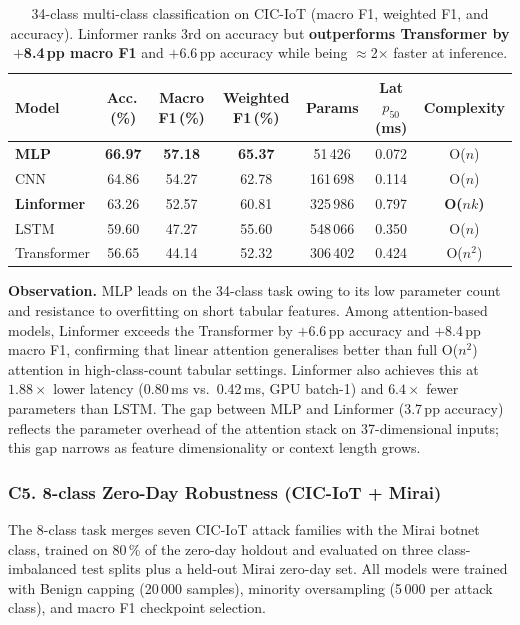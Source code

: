 \begin{table}[h]
\centering
\caption{34-class multi-class classification on CIC-IoT (macro F1, weighted F1,
and accuracy). Linformer ranks 3rd on accuracy but \textbf{outperforms
Transformer by $+$8.4\,pp macro F1} and $+$6.6\,pp accuracy while being
$\approx$2$\times$ faster at inference.}
\label{tab:multiclass}
\begin{tabular}{lcccccc}
\toprule
\textbf{Model} & \textbf{Acc.\,(\%)} & \textbf{Macro F1\,(\%)} &
\textbf{Weighted F1\,(\%)} & \textbf{Params} &
\textbf{Lat $p_{50}$ (ms)} & \textbf{Complexity} \\
\midrule
\textbf{MLP}  & \textbf{66.97} & \textbf{57.18} & \textbf{65.37} &  51\,426 & 0.072 & O($n$) \\
CNN           & 64.86 & 54.27 & 62.78 & 161\,698 & 0.114 & O($n$) \\
\textbf{Linformer} & 63.26 & 52.57 & 60.81 & 325\,986 & 0.797 & \textbf{O($nk$)} \\
LSTM          & 59.60 & 47.27 & 55.60 & 548\,066 & 0.350 & O($n$) \\
Transformer   & 56.65 & 44.14 & 52.32 & 306\,402 & 0.424 & O($n^2$) \\
\bottomrule
\end{tabular}
\end{table}

\textbf{Observation.}
MLP leads on the 34-class task owing to its low parameter count and resistance
to overfitting on short tabular features.
Among attention-based models, Linformer exceeds the Transformer by
$+$6.6\,pp accuracy and $+$8.4\,pp macro F1, confirming that linear attention
generalises better than full O($n^2$) attention in high-class-count tabular
settings.
Linformer also achieves this at $1.88\times$ lower latency (0.80\,ms vs.\ 0.42\,ms,
GPU batch-1) and $6.4\times$ fewer parameters than LSTM.
The gap between MLP and Linformer (3.7\,pp accuracy) reflects the parameter
overhead of the attention stack on 37-dimensional inputs; this gap narrows as
feature dimensionality or context length grows.

\subsubsection{C5. 8-class Zero-Day Robustness (CIC-IoT + Mirai)}

The 8-class task merges seven CIC-IoT attack families with the Mirai botnet
class, trained on 80\,\% of the zero-day holdout and evaluated on three
class-imbalanced test splits plus a held-out Mirai zero-day set.
All models were trained with Benign capping (20\,000 samples), minority
oversampling (5\,000 per attack class), and macro F1 checkpoint selection.

